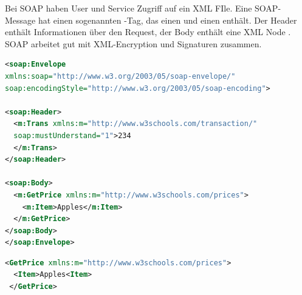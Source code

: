 Bei SOAP haben User und Service Zugriff auf ein XML FIle. Eine SOAP-Message hat einen sogenannten -Tag, das einen  und einen  enthält. Der Header enthält Informationen über den Request, der Body enthält eine XML Node	. SOAP arbeitet gut mit XML-Encryption und Signaturen zusammen.\\
\begin{minipage}{0.45\textwidth}
\begin{lstlisting}[language=XML, caption={SOAP-Envelope}, label=lst:soapenvelope]
<soap:Envelope
xmlns:soap="http://www.w3.org/2003/05/soap-envelope/"
soap:encodingStyle="http://www.w3.org/2003/05/soap-encoding">

<soap:Header>
  <m:Trans xmlns:m="http://www.w3schools.com/transaction/"
  soap:mustUnderstand="1">234
  </m:Trans>
</soap:Header>

<soap:Body>
  <m:GetPrice xmlns:m="http://www.w3schools.com/prices">
    <m:Item>Apples</m:Item>
  </m:GetPrice>
</soap:Body>
</soap:Envelope>
\end{lstlisting}
\end{minipage}
\hfill
\begin{minipage}{0.45\textwidth}
\begin{lstlisting}[language=XML, caption={Extracted Message}, label=lst:soapextractedmessage] 
<GetPrice xmlns:m="http://www.w3schools.com/prices">
  <Item>Apples<Item>
 </GetPrice>
\end{lstlisting}
\end{minipage}\\

